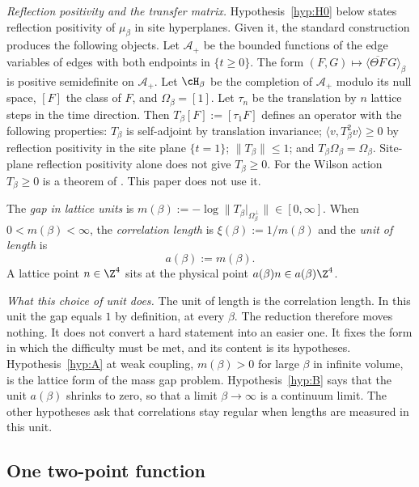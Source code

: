 \emph{Reflection positivity and the transfer matrix.} Hypothesis~\ref{hyp:H0} below states reflection positivity of $\mu_\beta$ in site hyperplanes. Given it, the standard construction \cite{OS78} produces the following objects. Let $\mathcal{A}_+$ be the bounded functions of the edge variables of edges with both endpoints in $\{t\ge0\}$. The form $(F,G)\mapsto\langle\overline{\Theta F}\,G\rangle_\beta$ is positive semidefinite on $\mathcal{A}_+$. Let $\cH_\beta$ be the completion of $\mathcal{A}_+$ modulo its null space, $[F]$ the class of $F$, and $\Omega_\beta=[1]$. Let $\tau_n$ be the translation by $n$ lattice steps in the time direction. Then $T_\beta[F]:=[\tau_1F]$ defines an operator with the following properties: $T_\beta$ is self-adjoint by translation invariance; $\langle v,T_\beta^2v\rangle\ge0$ by reflection positivity in the site plane $\{t=1\}$; $\|T_\beta\|\le1$; and $T_\beta\Omega_\beta=\Omega_\beta$. Site-plane reflection positivity alone does not give $T_\beta\ge0$. For the Wilson action $T_\beta\ge0$ is a theorem of \cite{Lu77}. This paper does not use it.

\begin{definition}\label{red:def-gap}
The \emph{gap in lattice units} is $m(\beta):=-\log\|T_\beta|_{\Omega_\beta^\perp}\|\in[0,\infty]$. When $0<m(\beta)<\infty$, the \emph{correlation length} is $\xi(\beta):=1/m(\beta)$ and the \emph{unit of length} is
\[
  a(\beta):=m(\beta).
\]
A lattice point $n\in\Z^4$ sits at the physical point $a(\beta)n\in a(\beta)\Z^4$.
\end{definition}

\emph{What this choice of unit does.} The unit of length is the correlation length. In this unit the gap equals $1$ by definition, at every $\beta$. The reduction therefore moves nothing. It does not convert a hard statement into an easier one. It fixes the form in which the difficulty must be met, and its content is its hypotheses. Hypothesis~\ref{hyp:A} at weak coupling, $m(\beta)>0$ for large $\beta$ in infinite volume, is the lattice form of the mass gap problem. Hypothesis~\ref{hyp:B} says that the unit $a(\beta)$ shrinks to zero, so that a limit $\beta\to\infty$ is a continuum limit. The other hypotheses ask that correlations stay regular when lengths are measured in this unit.

\subsection{One two-point function}\label{red:R}

